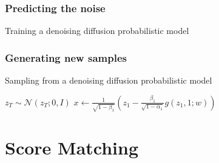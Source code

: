 \documentclass{beamer}
\begin{document}
\begin{frame}
    \frametitle{Predicting the noise}
    \begin{algorithm}[H]
        \caption{Training a denoising diffusion probabilistic model}
        \;
    \end{algorithm}
\end{frame}

\begin{frame}
    \frametitle{Generating new samples}
    \begin{algorithm}[H]
        \caption{Sampling from a denoising diffusion probabilistic model}
        $z_{T}\sim\mathcal{N}(z_{T};0,I)$\;
        $x\gets\frac{1}{\sqrt{1-\beta_{1}}}(z_{1}-\frac{\beta_{1}}{\sqrt{1-\alpha_{1}}}g(z_{1},1;w))$\;
        \;
    \end{algorithm}
\end{frame}

\section{Score Matching}
\end{document}

